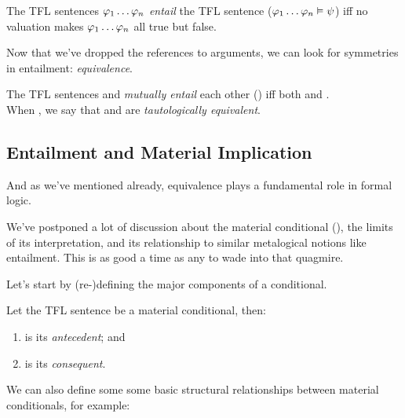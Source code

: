 \begin{definition}[Entailment]
  \label{def:tfl-entailment}
  The TFL sentences $\varphi_1\dots\varphi_n$ \emph{entail} the TFL sentence \spsi
  ($\varphi_1\dots\varphi_n\vDash\psi$) iff no valuation makes
  $\varphi_1\dots\varphi_n$ all true but \spsi false.
\end{definition}

Now that we've dropped the references to arguments, we can look for symmetries
in entailment: \emph{equivalence}.

\begin{definition}
  \label{def:tfl-mutual-entailment}
  The TFL sentences \sphi and \spsi \emph{mutually entail} each other
  (\ephi\emutual\epsi) iff both \ephi\eentails\spsi and \epsi\eentails\ephi.
  \\
  When \ephi\emutual\epsi, we say that \sphi and \spsi are \emph{tautologically
  equivalent}.
\end{definition}

\subsection{Entailment and Material Implication}

And as we've mentioned already, equivalence plays a fundamental role in formal
logic.

We've postponed a lot of discussion about the material conditional (\eif), the
limits of its interpretation, and its relationship to similar metalogical
notions like entailment. This is as good a time as any to wade into that
quagmire.

Let's start by (re-)defining the major components of a conditional.

\begin{definition}
  \label{def:antecedent-consequent}
  Let the TFL sentence \ephi\eif\spsi be a material conditional, then:
  \begin{enumerate}
  \item \sphi is its \emph{antecedent}; and
  \item \spsi is its \emph{consequent}.
  \end{enumerate}
\end{definition}

We can also define some some basic structural relationships between material
conditionals, for example:

